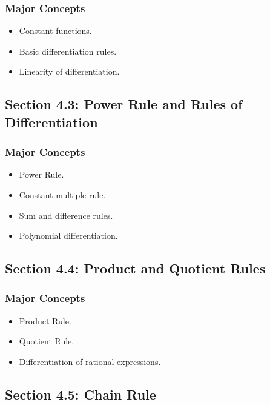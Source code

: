 \documentclass[11pt]{article}
\begin{document}
\subsubsection{Major Concepts}

\begin{itemize}
    \item Constant functions.
    \item Basic differentiation rules.
    \item Linearity of differentiation.
\end{itemize}

\subsection{Section 4.3: Power Rule and Rules of Differentiation}

\subsubsection{Major Concepts}

\begin{itemize}
    \item Power Rule.
    \item Constant multiple rule.
    \item Sum and difference rules.
    \item Polynomial differentiation.
\end{itemize}

\subsection{Section 4.4: Product and Quotient Rules}

\subsubsection{Major Concepts}

\begin{itemize}
    \item Product Rule.
    \item Quotient Rule.
    \item Differentiation of rational expressions.
\end{itemize}

\subsection{Section 4.5: Chain Rule}
\end{document}
